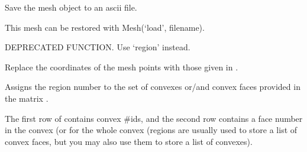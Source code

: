 \documentclass[a4paper,11pt,english]{sphinxmanual}
\begin{document}
\begin{fulllineitems}
\begin{fulllineitems}
\end{fulllineitems}


\begin{fulllineitems}
\label{\detokenize{python/cmdref_Mesh:getfem.Mesh.save}}
Save the mesh object to an ascii file.

This mesh can be restored with Mesh(‘load’, filename).

\end{fulllineitems}


\begin{fulllineitems}
\label{\detokenize{python/cmdref_Mesh:getfem.Mesh.set_boundary}}
DEPRECATED FUNCTION. Use ‘region’ instead.

\end{fulllineitems}


\begin{fulllineitems}
\label{\detokenize{python/cmdref_Mesh:getfem.Mesh.set_pts}}
Replace the coordinates of the mesh points with those given in .

\end{fulllineitems}


\begin{fulllineitems}
\label{\detokenize{python/cmdref_Mesh:getfem.Mesh.set_region}}
Assigns the region number  to the set of convexes or/and convex
faces provided in the matrix .

The first row of  contains convex \#ids, and the second row
contains a face number in the convex (or 
for the whole convex (regions are usually used to store a list of
convex faces, but you may also use them to store a list of convexes).


\end{fulllineitems}
\end{fulllineitems}
\end{document}
